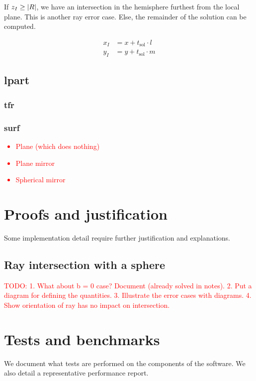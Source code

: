 If $z_I \geq \abs{R}$, we have an intersection in the hemisphere furthest from
the local plane. This is another ray error case. Else, the remainder of the
solution can be computed.

\begin{equation}
\begin{aligned}
x_I &= x + t_\textrm{sol} \cdot l \\
y_I &= y + t_\textrm{sol} \cdot m
\end{aligned}
\end{equation}

\subsection{lpart}

\subsubsection{tfr}

\subsubsection{surf}
\textcolor{red}{
\begin{itemize}
\item Plane (which does nothing)
\item Plane mirror
\item Spherical mirror
\end{itemize}}

\section{Proofs and justification}
Some implementation detail require further justification and explanations.

\subsection{Ray intersection with a sphere}
\textcolor{red}{TODO:
1. What about b = 0 case? Document (already solved in notes).
2. Put a diagram for defining the quantities.
3. Illustrate the error cases with diagrams.
4. Show orientation of ray has no impact on intersection.}

\section{Tests and benchmarks}
We document what tests are performed on the components of the software.
We also detail a representative performance report.

